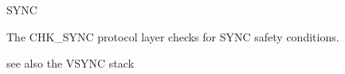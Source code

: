 \begin{Layer}{SYNC}
\begin{Sources}
\end{Sources}

\begin{GenEvent}
\end{GenEvent}

\begin{Testing}
\item
The CHK\_SYNC protocol layer checks for SYNC safety conditions.
\item 
see also the VSYNC stack
\end{Testing}
\end{Layer}

